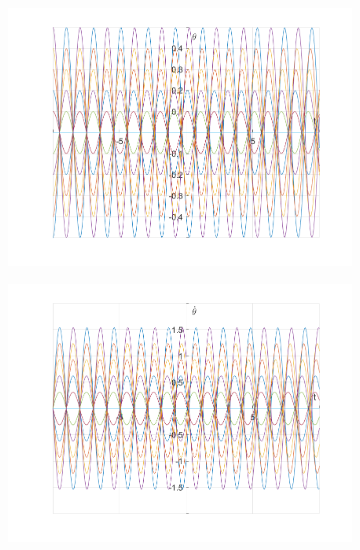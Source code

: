 \documentclass{article}
\begin{document}
			\begin{figure}[h!]
		\centering
		\begin{subfigure}[b]{0.48\linewidth}
			\includegraphics[width=\linewidth]{./SmallOscillations/S8/F1.png}
		\end{subfigure}
		\begin{subfigure}[b]{0.48\linewidth}
			\includegraphics[width=\linewidth]{./SmallOscillations/S8/F2.png}
		\end{subfigure}
	\end{figure}
\end{document}
